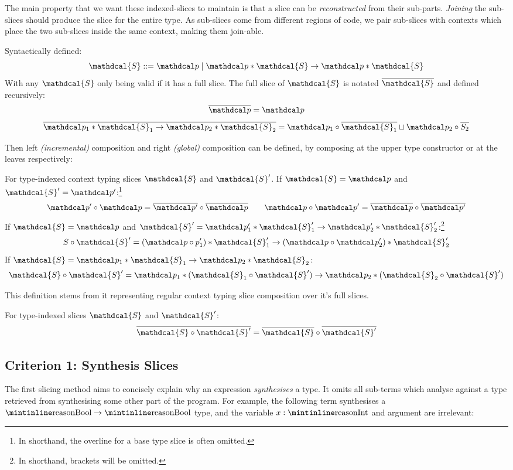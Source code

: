 The main property that we want these indexed-slices to maintain is that a slice can be \textit{reconstructed} from their sub-parts. \textit{Joining} the sub-slices should produce the slice for the entire type. As sub-slices come from different regions of code, we pair sub-slices with contexts which place the two sub-slices inside the same context, making them join-able.

\renewcommand{\S}{\mathdcal{S}}
\renewcommand{\s}{\mathdcal{s}}
\begin{definition}
Syntactically defined: 
\[\S ::= \p \mid \p * \S \to \p * \S\] 
With any $\S$ only being valid if it has a full slice. The full slice of $\S$ is notated $\overline{\S}$ and defined recursively:
\[\overline{\p} = \p\]
\[\overline{\p_1 * \S_1 \to \p_2 * \S_2} = \p_1 \circ \overline{\S_1} \sqcup \p_2 \circ \overline{S_2}\]
\end{definition}
Then left \textit{(incremental)} composition and right \textit{(global)} composition can be defined, by composing at the upper type constructor or at the leaves respectively:
\begin{definition}
For type-indexed context typing slices $\S$ and $\S'$.  If $\S = \p$ and $\S' = \p'$:\footnote{In shorthand, the overline for a base type slice is often omitted.}
\[\p' \circ \p = \overline{\p'} \circ \overline{\p}\qquad \p \circ \p' = \overline{\p} \circ \overline{\p'}\]
If $\S = \p$ and $\S' = \p_1' * \S_1' \to \p_2' * \S_2'$:\footnote{In shorthand, brackets will be omitted.}
\[S \circ \S' = (\p \circ p_1') * \S_1' \to (\p \circ \p_2') * \S_2'\]
If $\S = \p_1 * \S_1 \to \p_2 * \S_2$:
\[\S \circ \S' = \p_1 * (\S_1 \circ \S') \to \p_2 * (\S_2 \circ \S')\]
\end{definition}

This definition stems from it representing regular context typing slice composition over it's full slices.
\begin{proposition}
For type-indexed slices $\S$ and $\S'$: 
\[\overline{\S \circ \S'} = \overline{\S} \circ \overline{\S'}\]
\end{proposition}


\subsection{Criterion 1: Synthesis Slices}
\label{sec:SynthesisSlices}

The first slicing method aims to concisely explain why an expression \textit{synthesises} a type. It omits all  sub-terms which analyse against a type retrieved from synthesising some other part of the program. For example, the following term synthesises a $\code{Bool} \to \code{Bool}$ type, and the variable $x : \code{Int}$ and argument are irrelevant:


